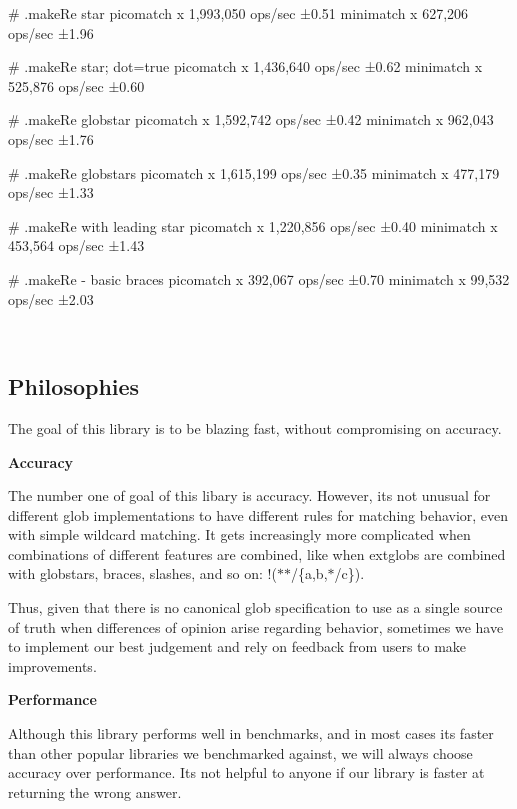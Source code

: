 \begin{DoxyCode}
# .makeRe star
  picomatch x 1,993,050 ops/sec ±0.51%
  minimatch x 627,206 ops/sec ±1.96%

# .makeRe star; dot=true
  picomatch x 1,436,640 ops/sec ±0.62%
  minimatch x 525,876 ops/sec ±0.60%

# .makeRe globstar
  picomatch x 1,592,742 ops/sec ±0.42%
  minimatch x 962,043 ops/sec ±1.76%

# .makeRe globstars
  picomatch x 1,615,199 ops/sec ±0.35%
  minimatch x 477,179 ops/sec ±1.33%

# .makeRe with leading star
  picomatch x 1,220,856 ops/sec ±0.40%
  minimatch x 453,564 ops/sec ±1.43%

# .makeRe - basic braces
  picomatch x 392,067 ops/sec ±0.70%
  minimatch x 99,532 ops/sec ±2.03%
\end{DoxyCode}


~\newline
 ~\newline


\subsection*{Philosophies}

The goal of this library is to be blazing fast, without compromising on accuracy.

{\bfseries Accuracy}

The number one of goal of this libary is accuracy. However, it\textquotesingle{}s not unusual for different glob implementations to have different rules for matching behavior, even with simple wildcard matching. It gets increasingly more complicated when combinations of different features are combined, like when extglobs are combined with globstars, braces, slashes, and so on\+: {\ttfamily !($\ast$$\ast$/\{a,b,$\ast$/c\})}.

Thus, given that there is no canonical glob specification to use as a single source of truth when differences of opinion arise regarding behavior, sometimes we have to implement our best judgement and rely on feedback from users to make improvements.

{\bfseries Performance}

Although this library performs well in benchmarks, and in most cases it\textquotesingle{}s faster than other popular libraries we benchmarked against, we will always choose accuracy over performance. It\textquotesingle{}s not helpful to anyone if our library is faster at returning the wrong answer.

